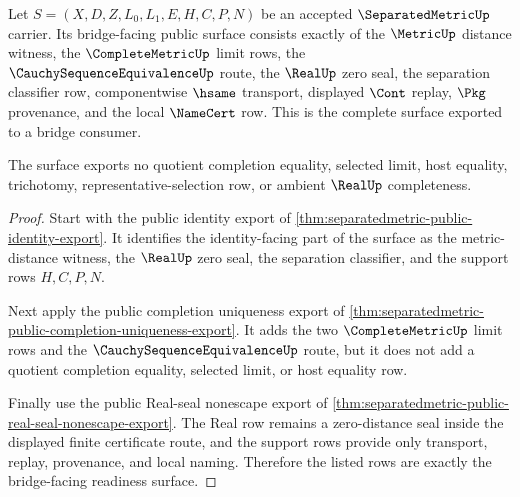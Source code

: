 \begin{theorem}
\label{thm:separatedmetric-bridged-closure-readiness}
Let $S=(X,D,Z,L_0,L_1,E,H,C,P,N)$ be an accepted $\SeparatedMetricUp$ carrier. Its bridge-facing public surface consists exactly of the $\MetricUp$ distance witness, the $\CompleteMetricUp$ limit rows, the $\CauchySequenceEquivalenceUp$ route, the $\RealUp$ zero seal, the separation classifier row, componentwise $\hsame$ transport, displayed $\Cont$ replay, $\Pkg$ provenance, and the local $\NameCert$ row. This is the complete surface exported to a bridge consumer.

The surface exports no quotient completion equality, selected limit, host equality, trichotomy, representative-selection row, or ambient $\RealUp$ completeness.
\end{theorem}
\begin{proof}
Start with the public identity export of \autoref{thm:separatedmetric-public-identity-export}. It identifies the identity-facing part of the surface as the metric-distance witness, the $\RealUp$ zero seal, the separation classifier, and the support rows $H,C,P,N$.

Next apply the public completion uniqueness export of \autoref{thm:separatedmetric-public-completion-uniqueness-export}. It adds the two $\CompleteMetricUp$ limit rows and the $\CauchySequenceEquivalenceUp$ route, but it does not add a quotient completion equality, selected limit, or host equality row.

Finally use the public Real-seal nonescape export of \autoref{thm:separatedmetric-public-real-seal-nonescape-export}. The Real row remains a zero-distance seal inside the displayed finite certificate route, and the support rows provide only transport, replay, provenance, and local naming. Therefore the listed rows are exactly the bridge-facing readiness surface.
\end{proof}

